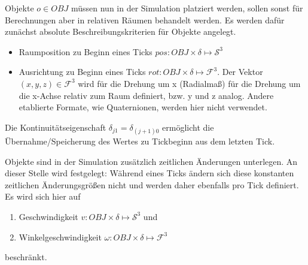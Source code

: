 Objekte $o\in OBJ$ müssen nun in der Simulation platziert werden, sollen sonst für Berechnungen aber in relativen Räumen behandelt werden. Es werden dafür zunächst absolute Beschreibungskriterien für Objekte angelegt.
\begin{itemize}
\item Raumposition zu Beginn eines Ticks $pos : OBJ \times \delta \mapsto \mathcal{S}^3$
\item Ausrichtung zu Beginn eines Ticks $rot : OBJ \times \delta \mapsto \mathcal{F}^3$. Der Vektor $(x, y, z) \in\mathcal{F}^3$ wird für die Drehung um x (Radialmaß) für die Drehung um die x-Achse relativ zum Raum definiert, bzw. y und z analog. Andere etablierte Formate, wie Quaternionen, werden hier nicht verwendet.
\end{itemize}
Die Kontinuitätseigenschaft $\delta_{j1} = \delta_{(j+1)0}$ ermöglicht die Übernahme/Speicherung des Wertes zu Tickbeginn aus dem letzten Tick.

Objekte sind in der Simulation zusätzlich zeitlichen Änderungen unterlegen.
An dieser Stelle wird festgelegt: Während eines Ticks ändern sich diese konstanten zeitlichen Änderungsgrößen nicht und werden daher ebenfalls pro Tick definiert.\\
 Es wird sich hier auf
\begin{enumerate}
\item Geschwindigkeit $v: OBJ \times \delta \mapsto \mathcal{S}^3$  und
\item Winkelgeschwindigkeit $\omega : OBJ \times \delta \mapsto \mathcal{F}^3 $
\end{enumerate}
beschränkt.

